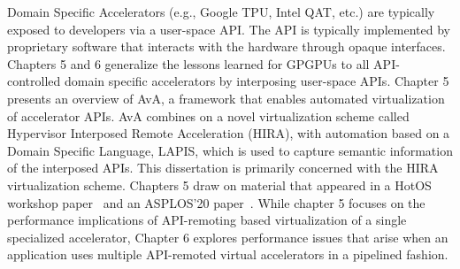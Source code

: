Domain Specific Accelerators (e.g., Google TPU, Intel QAT, etc.) are
typically exposed to developers via a user-space API. The API is typically
implemented by proprietary software that interacts with the hardware through
opaque interfaces.
Chapters 5 and 6 generalize the lessons learned for GPGPUs to all
API-controlled domain specific accelerators by interposing user-space APIs.
Chapter 5 presents an overview of AvA, a framework that enables automated
virtualization of accelerator APIs. AvA combines on a novel virtualization
scheme called Hypervisor Interposed Remote Acceleration (HIRA), with
automation based on a Domain Specific Language, LAPIS, which is used to
capture semantic information of the interposed APIs. This dissertation is
primarily concerned with the HIRA virtualization scheme.
Chapters 5 draw on material that appeared in a HotOS workshop
paper~\cite{ava-hotos} and an ASPLOS'20 paper~\cite{ava-asplos}.
While chapter 5 focuses on the performance implications of API-remoting based
virtualization of a single specialized accelerator, Chapter 6 explores
performance issues that arise when an application uses multiple API-remoted
virtual accelerators in a pipelined fashion.